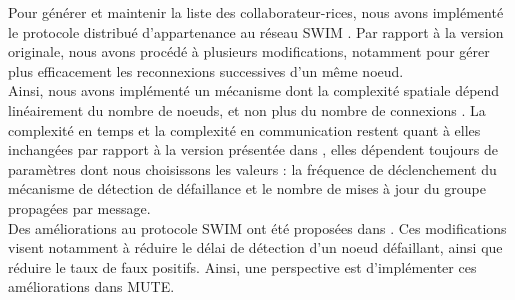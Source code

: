 Pour générer et maintenir la liste des collaborateur-rices, nous avons implémenté le protocole distribué d'appartenance au réseau SWIM \cite{swim2002}.
Par rapport à la version originale, nous avons procédé à plusieurs modifications, notamment pour gérer plus efficacement les reconnexions successives d'un même noeud.\\

Ainsi, nous avons implémenté un mécanisme dont la complexité spatiale dépend linéairement du nombre de noeuds, et non plus du nombre de connexions .
La complexité en temps et la complexité en communication restent quant à elles inchangées par rapport à la version présentée dans \cite{swim2002}, \ie elles dépendent toujours de paramètres dont nous choisissons les valeurs : la fréquence de déclenchement du mécanisme de détection de défaillance et le nombre de mises à jour du groupe propagées par message.\\

Des améliorations au protocole SWIM ont été proposées dans \cite{lifeguard2018}.
Ces modifications visent notamment à réduire le délai de détection d'un noeud défaillant, ainsi que réduire le taux de faux positifs.
Ainsi, une perspective est d'implémenter ces améliorations dans MUTE.
